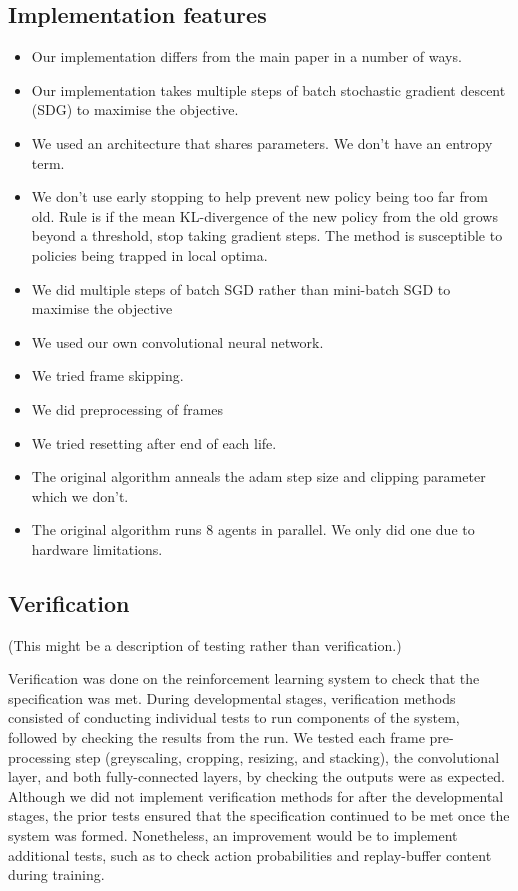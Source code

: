 \documentclass[12pt,a4paper]{article}
\begin{document}
\subsection{Implementation features}
\begin{itemize}
    \item Our implementation differs from the main paper in a number of ways.
    \item Our implementation takes multiple steps of batch stochastic gradient descent (SDG) to maximise the objective.
    \item We used an architecture that shares parameters. We don't have an entropy term.
    \item We don't use early stopping to help prevent new policy being too far from old. Rule is if the mean KL-divergence of the new policy from the old grows beyond a threshold, stop taking gradient steps. The method is susceptible to policies being trapped in local optima.
    \item We did multiple steps of batch SGD rather than mini-batch SGD to maximise the objective
    \item We used our own convolutional neural network.
    \item We tried frame skipping.
    \item We did preprocessing of frames
    \item We tried resetting after end of each life. 
    \item The original algorithm anneals the adam step size and clipping parameter which we don't.
    \item The original algorithm runs 8 agents in parallel. We only did one due to hardware limitations.
\end{itemize}



\subsection{Verification}
(This might be a description of testing rather than verification.)

Verification was done on the reinforcement learning system to check that the specification was met. During developmental stages, verification methods consisted of conducting individual tests to run components of the system, followed by checking the results from the run. We tested each frame pre-processing step (greyscaling, cropping, resizing, and stacking), the convolutional layer, and both fully-connected layers, by checking the outputs were as expected. Although we did not implement verification methods for after the developmental stages, the prior tests ensured that the specification continued to be met once the system was formed. Nonetheless, an improvement would be to implement additional tests, such as to check action probabilities and replay-buffer content during training.
\end{document}
